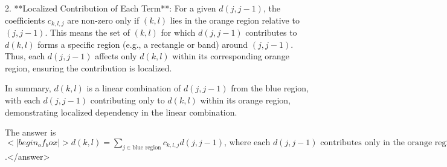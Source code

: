 2. **Localized Contribution of Each Term**:  
   For a given \( d(j,j-1) \), the coefficients \( c_{k,l,j} \) are non-zero only if \( (k,l) \) lies in the orange region relative to \( (j,j-1) \). This means the set of \( (k,l) \) for which \( d(j,j-1) \) contributes to \( d(k,l) \) forms a specific region (e.g., a rectangle or band) around \( (j,j-1) \). Thus, each \( d(j,j-1) \) affects only \( d(k,l) \) within its corresponding orange region, ensuring the contribution is localized.  

In summary, \( d(k,l) \) is a linear combination of \( d(j,j-1) \) from the blue region, with each \( d(j,j-1) \) contributing only to \( d(k,l) \) within its orange region, demonstrating localized dependency in the linear combination.  

The answer is \(<|begin_of_box|>d(k,l) = \sum_{j \in \text{blue region}} c_{k,l,j} d(j,j-1) \text{, where each } d(j,j-1) \text{ contributes only in the orange region}<|end_of_box|>\).</answer>